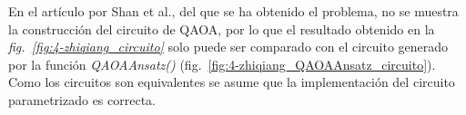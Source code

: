En el artículo por Shan et al.\cite{solving_shortest_path_with_qaoa}, del que se ha obtenido el problema, no se muestra la construcción del circuito de QAOA, por lo que el resultado obtenido en la \textit{fig.~\ref{fig:4-zhiqiang_circuito}} solo puede ser comparado con el circuito generado por la función \textit{QAOAAnsatz()} (fig.~\ref{fig:4-zhiqiang_QAOAAnsatz_circuito}).
\\
Como los circuitos son equivalentes se asume que la implementación del circuito parametrizado es correcta.


